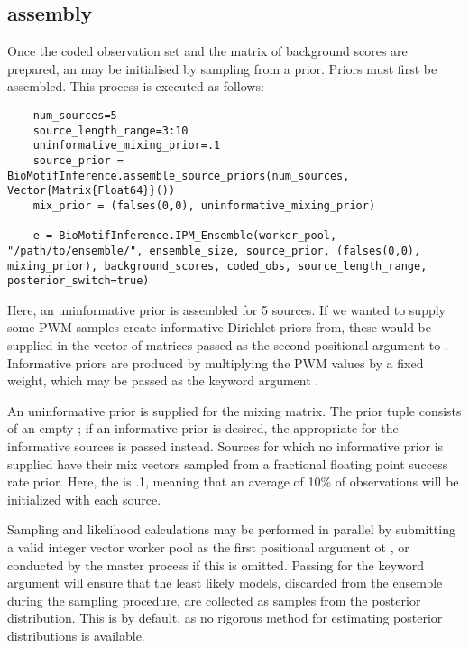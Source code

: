 \subsection{\protect{} assembly}
Once the coded observation set and the matrix of background scores are prepared, an  may be initialised by sampling from a prior. Priors must first be assembled. This process is executed as follows:

\begin{verbatim}
    num_sources=5
    source_length_range=3:10
    uninformative_mixing_prior=.1
    source_prior = BioMotifInference.assemble_source_priors(num_sources, Vector{Matrix{Float64}}())
    mix_prior = (falses(0,0), uninformative_mixing_prior)

    e = BioMotifInference.IPM_Ensemble(worker_pool, "/path/to/ensemble/", ensemble_size, source_prior, (falses(0,0), mixing_prior), background_scores, coded_obs, source_length_range, posterior_switch=true)
\end{verbatim}

Here, an uninformative prior is assembled for 5 sources. If we wanted to supply some PWM samples create informative Dirichlet priors from, these would be supplied in the vector of matrices passed as the second positional argument to . Informative priors are produced by multiplying the PWM values by a fixed weight, which may be passed as the keyword argument .

An uninformative prior is supplied for the mixing matrix. The prior tuple consists of an empty ; if an informative prior is desired, the appropriate  for the informative sources is passed instead. Sources for which no informative prior is supplied have their mix vectors sampled from a fractional floating point success rate prior. Here, the  is .1, meaning that an average of 10\% of observations will be initialized with each source.

Sampling and likelihood calculations may be performed in parallel by submitting a valid integer vector worker pool as the first positional argument ot , or conducted by the master process if this is omitted. Passing  for the keyword argument  will ensure that the least likely models, discarded from the ensemble during the sampling procedure, are collected as samples from the posterior distribution. This is  by default, as no rigorous method for estimating posterior distributions is available.

